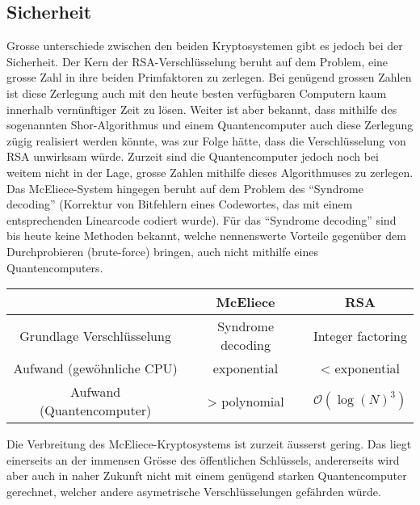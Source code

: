 \subsection{Sicherheit}
Grosse unterschiede zwischen den beiden Kryptosystemen gibt es jedoch bei der Sicherheit.
Der Kern der RSA-Verschlüsselung beruht auf dem Problem, eine grosse Zahl in ihre beiden Primfaktoren zu zerlegen.
Bei genügend grossen Zahlen ist diese Zerlegung auch mit den heute besten verfügbaren Computern kaum innerhalb vernünftiger Zeit zu lösen.
Weiter ist aber bekannt,
dass mithilfe des sogenannten Shor-Algorithmus \cite{mceliece:shor} und einem Quantencomputer auch diese Zerlegung zügig realisiert werden könnte,
was zur Folge hätte, dass die Verschlüsselung von RSA unwirksam würde.
Zurzeit sind die Quantencomputer jedoch noch bei weitem nicht in der Lage, grosse Zahlen mithilfe dieses Algorithmuses zu zerlegen.
Das McEliece-System hingegen beruht auf dem Problem des ``Syndrome decoding'' (Korrektur von Bitfehlern eines Codewortes, das mit einem entsprechenden Linearcode codiert wurde).
Für das ``Syndrome decoding'' sind bis heute keine Methoden bekannt,
welche nennenswerte Vorteile gegenüber dem Durchprobieren (brute-force) bringen,
auch nicht mithilfe eines Quantencomputers.
\begin{center}
\begin{tabular}{c|c|c}
                              &McEliece          &RSA              \\
\hline
    Grundlage Verschlüsselung &Syndrome decoding &Integer factoring\\
    Aufwand (gewöhnliche CPU) &exponential       &< exponential    \\
    Aufwand (Quantencomputer) &> polynomial      &$\mathcal{O}(\log(N)^3)$
\end{tabular}
\end{center}
Die Verbreitung des McEliece-Kryptosystems ist zurzeit äusserst gering.
Das liegt einerseits an der immensen Grösse des öffentlichen Schlüssels,
andererseits wird aber auch in naher Zukunft nicht mit einem genügend starken Quantencomputer gerechnet,
welcher andere asymetrische Verschlüsselungen gefährden würde.
